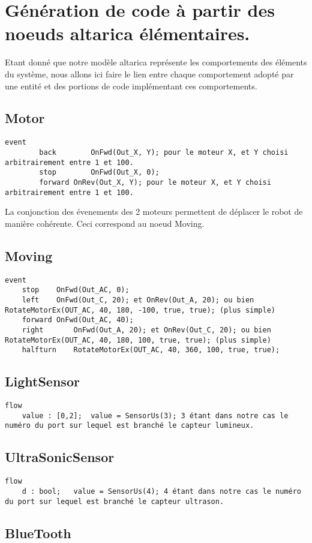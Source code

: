 \section{Génération de code à partir des noeuds altarica élémentaires.}

Etant donné que notre modèle altarica représente les comportements des éléments du système, nous allons ici faire le lien entre chaque comportement adopté par une entité et des portions de code implémentant ces comportements.

\subsection{Motor}

\begin{verbatim}
event
    	back		OnFwd(Out_X, Y); pour le moteur X, et Y choisi arbitrairement entre 1 et 100.
    	stop		OnFwd(Out_X, 0);
    	forward	OnRev(Out_X, Y); pour le moteur X, et Y choisi arbitrairement entre 1 et 100.

\end{verbatim}

La conjonction des évenements des 2 moteurs permettent de déplacer le robot de manière cohérente. Ceci correspond au noeud Moving.

\subsection{Moving}

\begin{verbatim}
event
	stop	OnFwd(Out_AC, 0);
	left	OnFwd(Out_C, 20); et OnRev(Out_A, 20); ou bien RotateMotorEx(OUT_AC, 40, 180, -100, true, true); (plus simple)
	forward	OnFwd(Out_AC, 40);
	right		OnFwd(Out_A, 20); et OnRev(Out_C, 20); ou bien RotateMotorEx(OUT_AC, 40, 180, 100, true, true); (plus simple)
	halfturn	RotateMotorEx(OUT_AC, 40, 360, 100, true, true);
\end{verbatim}

\subsection{LightSensor}

\begin{verbatim}
flow
    value : [0,2];	value = SensorUs(3); 3 étant dans notre cas le numéro du port sur lequel est branché le capteur lumineux.
\end{verbatim}

\subsection{UltraSonicSensor}

\begin{verbatim}
flow
    d : bool;	value = SensorUs(4); 4 étant dans notre cas le numéro du port sur lequel est branché le capteur ultrason.

\end{verbatim}

\subsection{BlueTooth}
